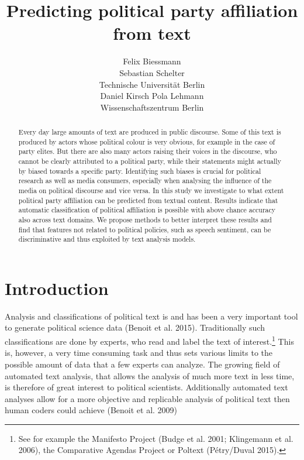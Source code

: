 \documentclass[11pt]{article}
\title{Predicting political party affiliation from text}
\author{Felix Biessmann\\
  \And
  Sebastian Schelter\\
  Technische Universit\"at Berlin\\
\And 
Daniel Kirsch
  \And
 Pola Lehmann \\
  Wissenschaftszentrum Berlin \\
  }
\date{}
\begin{document}
\maketitle


\begin{abstract}
Every day large amounts of text are produced in public discourse. Some of this text is produced by actors whose political colour is very obvious, for example in the case of party elites. But there are also many actors raising their voices in the discourse, who cannot be clearly attributed to a political party, while their statements might actually by biased towards a specific party. Identifying such biases is crucial for political research as well as media consumers, especially when analysing the influence of the media on political discourse and vice versa. In this study we investigate to what extent political party affiliation can be predicted from textual content. Results indicate that automatic classification of political affiliation is possible with above chance accuracy also across text domains. We propose methods to better interpret these results and find that features not related to political policies, such as speech sentiment, can be discriminative and thus exploited by text analysis models. 
\end{abstract}

\section{Introduction}
\label{sec:intro}
%
Analysis and classifications of political text is and has been a very important tool to generate political science data (Benoit et al. 2015). Traditionally such classifications are done by experts, who read and label the text of interest.\footnote{See for example the Manifesto Project (Budge et al. 2001; Klingemann et al. 2006), the Comparative Agendas Project or Poltext (Pétry/Duval 2015).} This is, however, a very time consuming task and thus sets various limits to the possible amount of data that a few experts can analyze. The growing field of automated text analysis, that allows the analysis of much more text in less time, is therefore of great interest to political scientists. Additionally automated text analyses allow for a more objective and replicable analysis of political text then human coders could achieve (Benoit et al. 2009)
\end{document}
